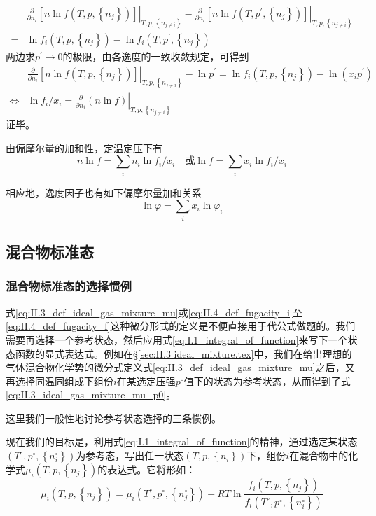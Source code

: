 \documentclass[main.tex]{subfiles}
\begin{document}
\begin{align*}
    & \left.\frac{\partial}{\partial n_i}\left[n\ln f\left(T,p,\left\{n_j\right\}\right)\right]\right|_{T,p,\left\{n_{j\neq i}\right\}}-\left.\frac{\partial}{\partial n_i}\left[n\ln f\left(T,p^\prime,\left\{n_j\right\}\right)\right]\right|_{T,p,\left\{n_{j\neq i}\right\}} \\
  = & \ln f_i\left(T,p,\left\{n_j\right\}\right)-\ln f_i\left(T,p^\prime,\left\{n_j\right\}\right)
\end{align*}
两边求$p^\prime\rightarrow 0$的极限，由各逸度的一致收敛规定，可得到
\begin{align*}
                  & \left.\frac{\partial}{\partial n_i}\left[n\ln f\left(T,p,\left\{n_j\right\}\right)\right]\right|_{T,p,\left\{n_{j\neq i}\right\}}-\ln p^\prime=\ln f_i\left(T,p,\left\{n_j\right\}\right)-\ln\left(x_ip^\prime\right) \\
  \Leftrightarrow & \ln f_i/x_i=\left.\frac{\partial}{\partial n_i}\left(n\ln f\right)\right|_{T,p,\left\{n_{j\neq i}\right\}}
\end{align*}
证毕。

由偏摩尔量的加和性，定温定压下有
\[n\ln f=\sum_i n_i\ln f_i/x_i\quad\text{或}\ln f=\sum_ix_i\ln f_i/x_i\]

相应地，逸度因子也有如下偏摩尔量加和关系
\[\ln \varphi=\sum_ix_i\ln\varphi_i\]

\subsection{混合物标准态}
\subsubsection{混合物标准态的选择惯例}
式\eqref{eq:II.3_def_ideal_gas_mixture_mu}或\eqref{eq:II.4_def_fugacity_i}至\eqref{eq:II.4_def_fugacity_f}这种微分形式的定义是不便直接用于代公式做题的。我们需要再选择一个参考状态，然后应用式\eqref{eq:I.1_integral_of_function}来写下一个状态函数的显式表达式。例如在\S\ref{sec:II.3 ideal_mixture.tex}中，我们在给出理想的气体混合物化学势的微分式定义式\eqref{eq:II.3_def_ideal_gas_mixture_mu}之后，又再选择同温同组成下组份$i$在某选定压强$p^\circ$值下的状态为参考状态，从而得到了式\eqref{eq:II.3_ideal_gas_mixture_mu_p0}。

这里我们一般性地讨论参考状态选择的三条惯例。

现在我们的目标是，利用式\eqref{eq:I.1_integral_of_function}的精神，通过选定某状态$\left(T^\circ,p^\circ,\left\{n_i^\circ\right\}\right)$为参考态，写出任一状态$\left(T,p,\left\{n_i\right\}\right)$下，组份$i$在混合物中的化学式$\mu_i\left(T,p,\left\{n_j\right\}\right)$的表达式。它将形如：
\begin{equation*}
  \mu_i\left(T,p,\left\{n_j\right\}\right)=\mu_i\left(T^\circ,p^\circ,\left\{n_j^\circ\right\}\right)+RT\ln\frac{f_i\left(T,p,\left\{n_j\right\}\right)}{f_i\left(T^\circ,p^\circ,\left\{n_i^\circ\right\}\right)}
\end{equation*}
\end{document}
